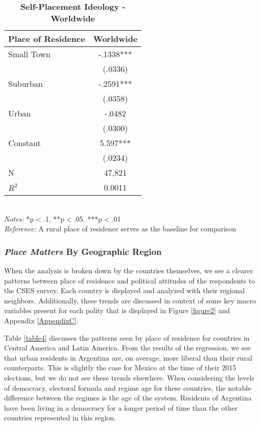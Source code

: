 \documentclass[12pt, titlepage]{article}
\newcommand\e{\emph}
\newcommand\tb{\textbf}
\begin{document}
\begin{singlespace}
	\begin{table}[H]
		\centering
		\caption{\tb{Self-Placement Ideology - Worldwide}}
		\begin{tabulary}{\linewidth}{l c}
			\\
			\hline
			\tb{Place of Residence}&\tb{Worldwide} \\
			\hline
			Small Town&-.1338***  \\    
			& (.0336)   \\
			Suburban & -.2591***\\ 
			& (.0358) \\
			Urban   & -.0482   \\
			& (.0300)    \\
			Constant   & 5.597***  \\
			&(.0234) \\
			N  & 47,821  \\
			$R^2$	& 0.0011 \\
			\hline                                       
		\end{tabulary}
		\\
		\e{Notes:} *p$<$.1, **p$<$.05. ***p$<$.01 \\
		\e{Reference:} A rural place of residence serves as the baseline for comparison
		\label{table3}
	\end{table}
\end{singlespace}

\subsubsection{\e{Place Matters} By Geographic Region}

When the analysis is broken down by the countries themselves, we see a clearer patterns between place of residence and political attitudes of the respondents to the CSES survey. Each country is displayed and analyzed with their regional neighbors. Additionally, these trends are discussed in context of some key macro variables present for each polity that is displayed in Figure \ref{figure2} and Appendix \ref{AppendixC}.

Table \ref{table4} discusses the patterns seen by place of residence for countries in Central America and Latin America. From the results of the regression, we see that urban residents in Argentina are, on average, more liberal than their rural counterparts. This is slightly the case for Mexico at the time of their 2015 elections, but we do not see these trends elsewhere. When considering the levels of democracy, electoral formula and regime age for these countries, the notable difference between the regimes is the age of the system. Residents of Argentina have been living in a democracy for a longer period of time than the other countries represented in this region. 
\end{document}
